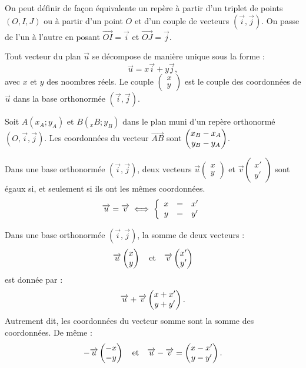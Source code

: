 \documentclass[a4paper, 12pt]{report}
\begin{document}
\begin{rmq}
On peut définir de façon équivalente un repère à partir d'un triplet de points $(O, I, J)$ ou à partir d'un point $O$ et d'un couple
de vecteurs $(\vec{i}, \vec{j})$. On passe de l'un à l'autre en posant $\vec{OI} = \vec{i}$ et $\vec{OJ} = \vec{j}$.
\end{rmq}

\begin{prop}
Tout vecteur du plan $\vec{u}$ se décompose de manière unique sous la forme :
\[ \vec{u} = x \vec{i} + y \vec{j} , \]
avec $x$ et $y$ des noombres réels. Le couple $\left ( \begin{array}{c} x \\ y \end{array} \right ) $ est le couple des coordonnées de 
$\vec{u}$ dans la base orthonormée $(\vec{i}, \vec{j})$.
\end{prop}

\begin{prop}
Soit $A(x_A ; y_A)$ et $B(_xB ; y_B)$ dans le plan muni d’un repère orthonormé $(O, \vec{i}, \vec{j})$.
Les coordonnées du vecteur $\vec{AB}$ sont $\pvec{x_B-x_A}{y_B-y_A}$.
\end{prop}

\begin{prop}
Dans une base orthonormée $(\vec{i}, \vec{j})$, deux vecteurs $\vec{u} \left ( \begin{array}{c} x \\ y \end{array} \right )$ et 
$\vec{v} \left ( \begin{array}{c} x' \\ y' \end{array} \right )$ sont égaux si, et seulement si ils ont les mêmes coordonnées.
\[ \vec{u} = \vec{v} \iff \left \{ \begin{array}{c c c} x & = & x' \\ y & = & y' \end{array} \right. \]
\end{prop}

\begin{prop}
Dans une base orthonormée $(\vec{i}, \vec{j})$, la somme de deux vecteurs :
\[ \vec{u} \pvec{x}{y} \et \vec{v} \pvec{x'}{y'} \]
est donnée par :
\[ \vec{u} + \vec{v} \pvec{x+x'}{y+y'} . \]
Autrement dit, les coordonnées du vecteur somme sont la somme des coordonnées.
De même :
\[ -\vec{u} \pvec{-x}{-y} \et \vec{u} - \vec{v} = \pvec{x-x'}{y-y'} . \]
\end{prop}
\end{document}
